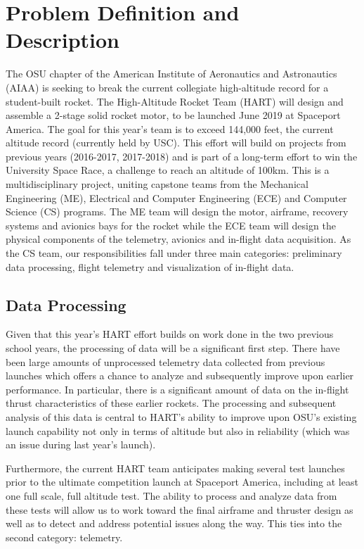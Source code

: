 \documentclass[onecolumn, draftclsnofoot,10pt, compsoc]{IEEEtran}
\begin{document}
\newpage
{}
\tableofcontents
\clearpage

\section{Problem Definition and Description}
The OSU chapter of the American Institute of Aeronautics and Astronautics (AIAA) is seeking to break the current collegiate high-altitude record for a student-built rocket. 
The High-Altitude Rocket Team (HART) will design and assemble a 2-stage solid rocket motor, to be launched June 2019 at Spaceport America. 
The goal for this year's team is to exceed 144,000 feet, the current altitude record (currently held by USC). 
This effort will build on projects from previous years (2016-2017, 2017-2018) and is part of a long-term effort to win the University Space Race, a challenge to reach an altitude of 100km. 
This is a multidisciplinary project, uniting capstone teams from the Mechanical Engineering (ME), Electrical and Computer Engineering (ECE) and Computer Science (CS) programs. 
The ME team will design the motor, airframe, recovery systems and avionics bays for the rocket while the ECE team will design the physical components of the telemetry, avionics and in-flight data acquisition. 
As the CS team, our responsibilities fall under three main categories: preliminary data processing, flight telemetry and visualization of in-flight data.

\subsection{Data Processing}
Given that this year's HART effort builds on work done in the two previous school years, the processing of data will be a significant first step. 
There have been large amounts of unprocessed telemetry data collected from previous launches which offers a chance to analyze and subsequently improve upon earlier performance. 
In particular, there is a significant amount of data on the in-flight thrust characteristics of these earlier rockets. 
The processing and subsequent analysis of this data is central to HART's ability to improve upon OSU's existing launch capability not only in terms of altitude but also in reliability (which was an issue during last year's launch).

Furthermore, the current HART team anticipates making several test launches prior to the ultimate competition launch at Spaceport America, including at least one full scale, full altitude test. 
The ability to process and analyze data from these tests will allow us to work toward the final airframe and thruster design as well as to detect and address potential issues along the way. 
This ties into the second category: telemetry.
\end{document}
